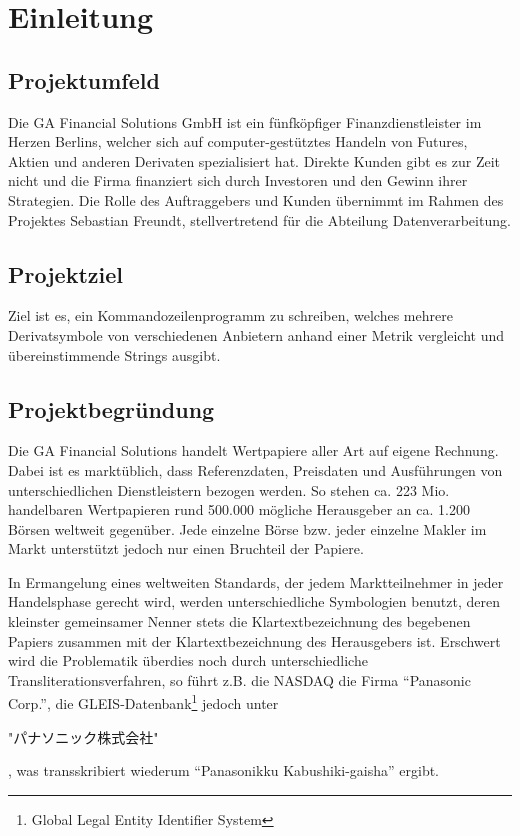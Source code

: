 \section{Einleitung}
\subsection{Projektumfeld}
Die GA Financial Solutions GmbH ist ein fünfköpfiger Finanzdienstleister im
Herzen Berlins, welcher sich auf computer-gestütztes Handeln
von Futures, Aktien und anderen Derivaten spezialisiert hat. Direkte Kunden gibt es zur Zeit
nicht und die Firma finanziert sich durch Investoren und den Gewinn ihrer
Strategien. Die Rolle des Auftraggebers und Kunden übernimmt im Rahmen des
Projektes Sebastian Freundt, stellvertretend für die Abteilung Datenverarbeitung.\par

\subsection{Projektziel}
Ziel ist es, ein Kommandozeilenprogramm zu schreiben, welches mehrere Derivatsymbole 
von verschiedenen Anbietern anhand einer Metrik vergleicht und übereinstimmende 
Strings ausgibt.\par

\subsection{Projektbegründung}
Die GA Financial Solutions handelt Wertpapiere aller Art auf eigene
Rechnung.  Dabei ist es marktüblich, dass Referenzdaten, Preisdaten
und Ausführungen von unterschiedlichen Dienstleistern bezogen werden.
So stehen ca. 223 Mio. handelbaren Wertpapieren rund 500.000 mögliche
Herausgeber an ca. 1.200 Börsen weltweit gegenüber.  Jede einzelne
Börse bzw. jeder einzelne Makler im Markt unterstützt jedoch nur
einen Bruchteil der Papiere.\par

In Ermangelung eines weltweiten Standards, der jedem Marktteilnehmer in
jeder Handelsphase gerecht wird, werden unterschiedliche Symbologien
benutzt, deren kleinster gemeinsamer Nenner stets die
Klartextbezeichnung des begebenen Papiers zusammen mit der
Klartextbezeichnung des Herausgebers ist.  Erschwert wird die
Problematik überdies noch durch unterschiedliche Transliterationsverfahren,
so führt z.B. die NASDAQ die Firma "`Panasonic Corp."',
die GLEIS-Datenbank\footnote{Global Legal Entity Identifier System} jedoch unter
\begin{CJK}{UTF8}{min}
"パナソニック株式会社"
\end{CJK}%
, was transskribiert wiederum "`Panasonikku Kabushiki-gaisha"' ergibt. \par

